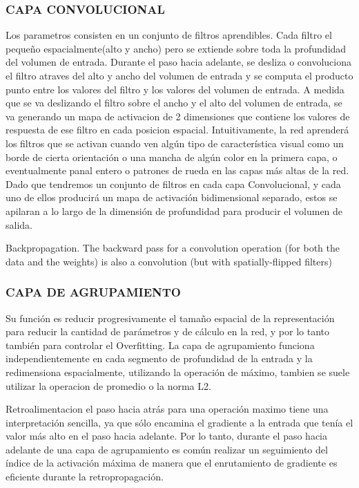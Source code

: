 \documentclass[a4paper,12pt,spanish]{book}
\begin{document}
      \subsubsection{CAPA CONVOLUCIONAL} 
	Los parametros consisten en un conjunto de filtros aprendibles. Cada filtro el pequeño espacialmente(alto y ancho) pero se extiende sobre toda la profundidad del volumen de entrada.
	Durante el paso hacia adelante, se desliza o convoluciona el filtro atraves del alto y ancho del volumen de entrada y se computa el producto punto entre los valores del filtro y los valores
	del volumen de entrada. A medida que se va deslizando el filtro sobre el ancho y el alto del volumen de entrada, se va generando un mapa de activacion de 2 dimensiones que contiene los 
	valores de respuesta de ese filtro en cada posicion espacial.
	Intuitivamente, la red aprenderá los filtros que se activan cuando ven algún tipo de característica visual como un borde de cierta orientación o una mancha de algún color en la 
	primera capa, o eventualmente panal entero o patrones de rueda en las capas más altas de la red. Dado que tendremos un conjunto de filtros en cada capa Convolucional, 
	y cada uno de ellos producirá un mapa de activación bidimensional separado, estos se apilaran a lo largo de la dimensión de profundidad para producir el volumen de salida.

	Backpropagation. The backward pass for a convolution operation (for both the data and the weights) is also a convolution (but with spatially-flipped filters)

      \subsubsection{CAPA DE AGRUPAMIENTO} 
	Su función es reducir progresivamente el tamaño espacial de la representación para reducir la cantidad de parámetros y de cálculo en la red, y por lo tanto también para controlar
	el Overfitting. La capa de agrupamiento funciona independientemente en cada segmento de profundidad de la entrada y la redimensiona espacialmente, utilizando la operación de máximo, 
	tambien se suele utilizar la operacion de promedio o la norma L2.

	Retroalimentacion
	el paso hacia atrás para una operación maximo tiene una interpretación sencilla, ya que sólo encamina el gradiente a la entrada que tenía el valor más alto en el paso hacia
	adelante. Por lo tanto, durante el paso hacia adelante de una capa de agrupamiento es común realizar un seguimiento del índice de la activación máxima de manera que 
	el enrutamiento de gradiente es eficiente durante la retropropagación.
\end{document}
